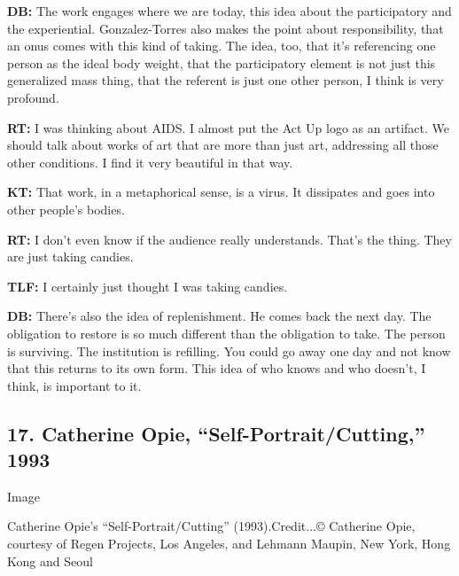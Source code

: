 \textbf{DB:} The work engages where we are today, this idea about the
participatory and the experiential. Gonzalez-Torres also makes the point
about responsibility, that an onus comes with this kind of taking. The
idea, too, that it's referencing one person as the ideal body weight,
that the participatory element is not just this generalized mass thing,
that the referent is just one other person, I think is very profound.

\textbf{RT:} I was thinking about AIDS. I almost put the Act Up logo as
an artifact. We should talk about works of art that are more than just
art, addressing all those other conditions. I find it very beautiful in
that way.

\textbf{KT:} That work, in a metaphorical sense, is a virus. It
dissipates and goes into other people's bodies.

\textbf{RT:} I don't even know if the audience really understands.
That's the thing. They are just taking candies.

\textbf{TLF:} I certainly just thought I was taking candies.

\textbf{DB:} There's also the idea of replenishment. He comes back the
next day. The obligation to restore is so much different than the
obligation to take. The person is surviving. The institution is
refilling. You could go away one day and not know that this returns to
its own form. This idea of who knows and who doesn't, I think, is
important to it.

\hypertarget{17-catherine-opie-self-portraitcutting-1993}{%
\subsection{17. Catherine Opie, ``Self-Portrait/Cutting,''
1993}\label{17-catherine-opie-self-portraitcutting-1993}}

Image

Catherine Opie's ``Self-Portrait/Cutting'' (1993).Credit...© Catherine
Opie, courtesy of Regen Projects, Los Angeles, and Lehmann Maupin, New
York, Hong Kong and Seoul


